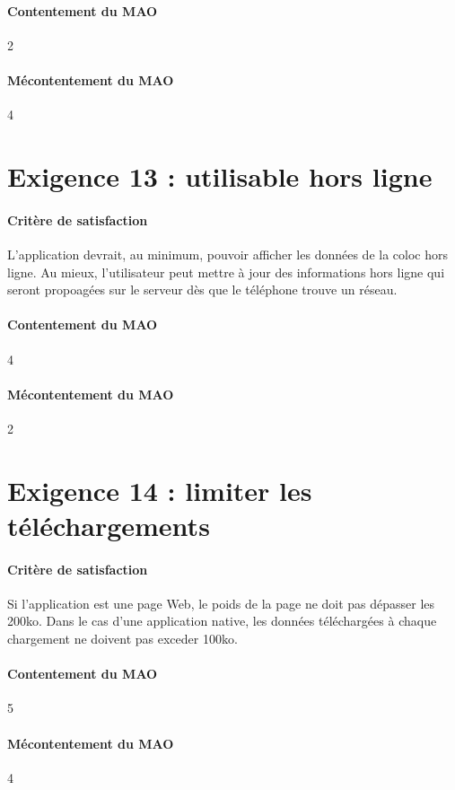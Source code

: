 \documentclass[a4paper, 12pt, french]{article}
\begin{document}
	\paragraph{Contentement du MAO}
	2

	\paragraph{Mécontentement du MAO}
	4

	\section{Exigence 13 : utilisable hors ligne}

	\paragraph{Critère de satisfaction}
	L'application devrait, au minimum, pouvoir afficher les données de la coloc hors ligne. Au mieux, l'utilisateur peut mettre à jour des informations hors ligne qui seront propoagées sur le serveur dès que le téléphone trouve un réseau.

	\paragraph{Contentement du MAO}
	4

	\paragraph{Mécontentement du MAO}
	2

	\section{Exigence 14 : limiter les téléchargements}

	\paragraph{Critère de satisfaction}
	Si l'application est une page Web, le poids de la page ne doit pas dépasser les 200ko. Dans le cas d'une application native, les données téléchargées à chaque chargement ne doivent pas exceder 100ko.

	\paragraph{Contentement du MAO}
	5

	\paragraph{Mécontentement du MAO}
	4
\end{document}
